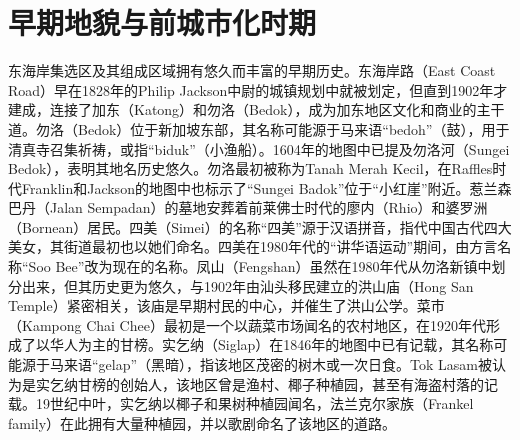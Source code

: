 \documentclass[11pt,a4paper,twoside,openany]{book}
\begin{document}
\section{早期地貌与前城市化时期}
东海岸集选区及其组成区域拥有悠久而丰富的早期历史。东海岸路（East Coast Road）早在1828年的Philip Jackson中尉的城镇规划中就被划定，但直到1902年才建成，连接了加东（Katong）和勿洛（Bedok），成为加东地区文化和商业的主干道。勿洛（Bedok）位于新加坡东部，其名称可能源于马来语“bedoh”（鼓），用于清真寺召集祈祷，或指“biduk”（小渔船）。1604年的地图中已提及勿洛河（Sungei Bedok），表明其地名历史悠久。勿洛最初被称为Tanah Merah Kecil，在Raffles时代Franklin和Jackson的地图中也标示了“Sungei Badok”位于“小红崖”附近。惹兰森巴丹（Jalan Sempadan）的墓地安葬着前莱佛士时代的廖内（Rhio）和婆罗洲（Bornean）居民。四美（Simei）的名称“四美”源于汉语拼音，指代中国古代四大美女，其街道最初也以她们命名。四美在1980年代的“讲华语运动”期间，由方言名称“Soo Bee”改为现在的名称。凤山（Fengshan）虽然在1980年代从勿洛新镇中划分出来，但其历史更为悠久，与1902年由汕头移民建立的洪山庙（Hong San Temple）紧密相关，该庙是早期村民的中心，并催生了洪山公学。菜市（Kampong Chai Chee）最初是一个以蔬菜市场闻名的农村地区，在1920年代形成了以华人为主的甘榜。实乞纳（Siglap）在1846年的地图中已有记载，其名称可能源于马来语“gelap”（黑暗），指该地区茂密的树木或一次日食。Tok Lasam被认为是实乞纳甘榜的创始人，该地区曾是渔村、椰子种植园，甚至有海盗村落的记载。19世纪中叶，实乞纳以椰子和果树种植园闻名，法兰克尔家族（Frankel family）在此拥有大量种植园，并以歌剧命名了该地区的道路。
\end{document}
